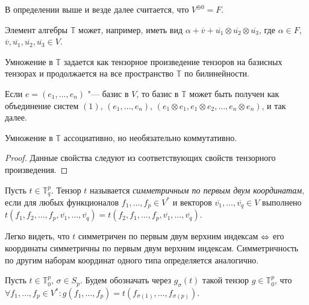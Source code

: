 \begin{note}
	В определении выше и везде далее считается, что $V^{\oplus 0} = F$.
\end{note}

\begin{example}
	Элемент алгебры $\mathbb{T}$ может, например, иметь вид $\alpha + \overline{v} + \overline{u_1} \otimes \overline{u_2} \otimes \overline{u_3}$, где $\alpha \in F$, $\overline{v}, \overline{u_1}, \overline{u_2}, \overline{u_3} \in V$.
\end{example}

\begin{note}
	Умножение в $\mathbb{T}$ задается как тензорное произведение тензоров на базисных тензорах и продолжается на все пространство $\mathbb{T}$ по билинейности.
\end{note}

\begin{note}
	Если $e = ({e_1}, \dots, {e_n})$ "--- базис в $V$, то базис в $\mathbb{T}$ может быть получен как объединение систем $(1)$, $(e_1, \dots, e_n)$, $(e_1 \otimes e_1, e_1 \otimes e_2, \dots, e_n \otimes e_n)$, и так далее.
\end{note}

\begin{proposition}
	Умножение в $\mathbb{T}$ ассоциативно, но необязательно коммутативно.
\end{proposition}

\begin{proof}
	Данные свойства следуют из соответствующих свойств тензорного произведения.
\end{proof}

\begin{definition}
	Пусть $t \in \mathbb{T}^p_q$. Тензор $t$ называется \textit{симметричным по первым двум координатам}, если для любых функционалов $f_1, \dots, f_p \in V^*$ и векторов $\overline{v_1}, \dots, \overline{v_q} \in V$ выполнено $t(f_1, f_2, \dots, f_p, \overline{v_1}, \dots, \overline{v_q}) = t(f_2, f_1, \dots, f_p, \overline{v_1}, \dots, \overline{v_q})$.
\end{definition}

\begin{note}
	Легко видеть, что $t$ симметричен по первым двум верхним индексам $\Leftrightarrow$ его координаты симметричны по первым двум верхним индексам. Симметричность по другим наборам координат одного типа определяется аналогично.
\end{note}

\begin{definition}
	Пусть $t \in \mathbb{T}^p_0$, $\sigma \in S_p$. Будем обозначать через $g_\sigma(t)$ такой тензор $g \in \mathbb{T}^p_0$, что $\forall f_1, \dotsc, f_p \in V^*: g(f_1, \dots, f_p) = t(f_{\sigma(1)}, \dots, f_{\sigma(p)})$.
\end{definition}

